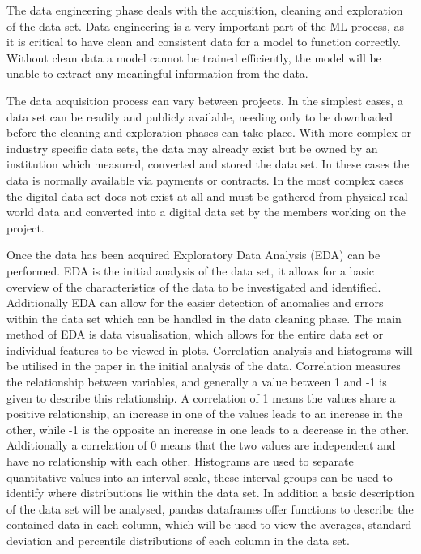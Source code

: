 \documentclass{imc-inf}
\begin{document}
	The data engineering phase deals with the acquisition, cleaning and exploration of the data set. Data engineering is a very important part of the ML process, as it is critical to have clean and consistent data for a model to function correctly. Without clean data a model cannot be trained efficiently, the model will be unable to extract any meaningful information from the data. 
	\newline
	
	The data acquisition process can vary between projects. In the simplest cases, a data set can be readily and publicly available, needing only to be downloaded before the cleaning and exploration phases can take place. With more complex or industry specific data sets, the data may already exist but be owned by an institution which measured, converted and stored the data set. In these cases the data is normally available via payments or contracts. In the most complex cases the digital data set does not exist at all and must be gathered from physical real-world data and converted into a digital data set by the members working on the project. 
	\newline
	
	Once the data has been acquired Exploratory Data Analysis (EDA) can be performed. EDA is the initial analysis of the data set, it allows for a basic overview of the characteristics of the data to be investigated and identified. Additionally EDA can allow for the easier detection of anomalies and errors within the data set which can be handled in the data cleaning phase. The main method of EDA is data visualisation, which allows for the entire data set or individual features to be viewed in plots. Correlation analysis and histograms will be utilised in the paper in the initial analysis of the data.  Correlation measures the relationship between variables, and generally a value between 1 and -1 is given to describe this relationship. A correlation of 1 means the values share a positive relationship, an increase in one of the values leads to an increase in the other, while -1 is the opposite an increase in one leads to a decrease in the other. Additionally a correlation of 0 means that the two values are independent and have no relationship with each other. Histograms are used to separate quantitative values into an interval scale, these interval groups can be used to identify where distributions lie within the data set. In addition a basic description of the data set will be analysed, pandas dataframes offer functions to describe the contained data in each column, which will be used to view the averages, standard deviation and percentile distributions of each column in the data set.
	\newline
	
\end{document}
